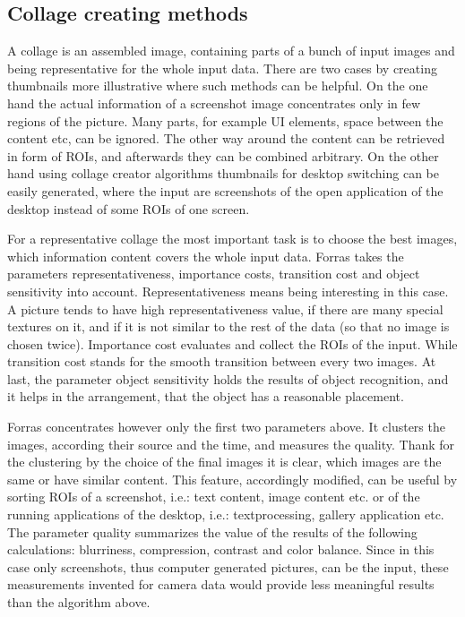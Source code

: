 \documentclass[draft,final]{vutinfth} %
\begin{document}
\subsection{Collage creating methods} 
A collage is an assembled image, containing parts of a bunch of input images and being representative for the whole input data.
There are two cases by creating thumbnails more illustrative where such methods can be helpful.
On the one hand the actual information of a screenshot image concentrates only in few regions of the picture.
Many parts, for example UI elements, space between the content etc, can be ignored. 
The other way around the content can be retrieved in form of ROIs, and afterwards they can be combined arbitrary.
On the other hand using collage creator algorithms thumbnails for desktop switching can be easily generated, where the input are screenshots of the open application of the desktop instead of some ROIs of one screen.\par
For a representative collage the most important task is to choose the best images, which information content covers the whole input data.
Forras takes the parameters representativeness, importance costs, transition cost and object sensitivity into account.
Representativeness means being interesting in this case.
A picture tends to have high representativeness value, if there are many special textures on it, and if it is not similar to the rest of the data (so that no image is chosen twice).
Importance cost evaluates and collect the ROIs of the input.
While transition cost stands for the smooth transition between every two images.
At last, the parameter object sensitivity holds the results of object recognition, and it helps in the arrangement, that the object has a reasonable placement.\par
Forras concentrates however only the first two parameters above.
It clusters the images, according their source and the time, and measures the quality.
Thank for the clustering by the choice of the final images it is clear,  which images are the same or have similar content.
This feature, accordingly modified, can be useful by sorting ROIs of a screenshot, i.e.: text content, image content etc. or of the running applications of the desktop, i.e.: textprocessing, gallery application etc.
The parameter quality summarizes the value of the results of the following calculations: blurriness, compression, contrast and color balance.
Since in this case only screenshots, thus computer generated pictures, can be the input, these measurements invented for camera data would provide less meaningful results than the algorithm above.\par 
\end{document}
